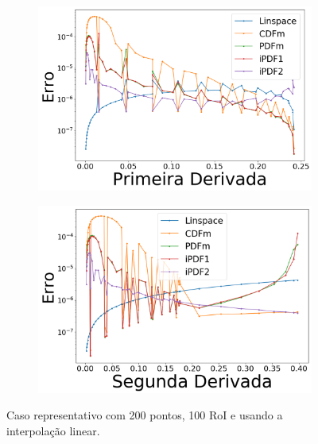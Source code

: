 \begin{figure}[H]
	\begin{subfigure}[b]{0.45\textwidth}
		\centering 
		\includegraphics[width=\textwidth]{./figuras/error_normal_linear_Primeira_Derivada.png}
		\caption{}
		\label{fig:11c}
	\end{subfigure}
	\hfill
	\begin{subfigure}[b]{0.45\textwidth}
		\centering 
		\includegraphics[width=\textwidth]{./figuras/error_normal_linear_Segunda_Derivada.png}
		\caption{}
		\label{fig:11d}
	\end{subfigure}
	
	\caption{Caso representativo com 200 pontos, 100 \ac{RoI} e usando a interpolação linear.}\label{fig:11}
\end{figure}

